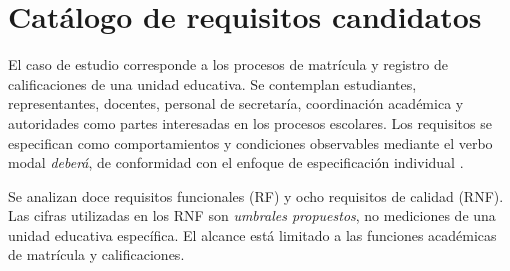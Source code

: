 \section{Catálogo de requisitos candidatos}
\label{sec:catalogo-requisitos}

El caso de estudio corresponde a los procesos de matrícula y registro de calificaciones de una unidad educativa. Se contemplan estudiantes, representantes, docentes, personal de secretaría, coordinación académica y autoridades como partes interesadas en los procesos escolares. Los requisitos se especifican como comportamientos y condiciones observables mediante el verbo modal \emph{deberá}, de conformidad con el enfoque de especificación individual \cite{iso29148,wiegers2013}.

Se analizan doce requisitos funcionales (RF) y ocho requisitos de calidad (RNF). Las cifras utilizadas en los RNF son \emph{umbrales propuestos}, no mediciones de una unidad educativa específica. El alcance está limitado a las funciones académicas de matrícula y calificaciones.

